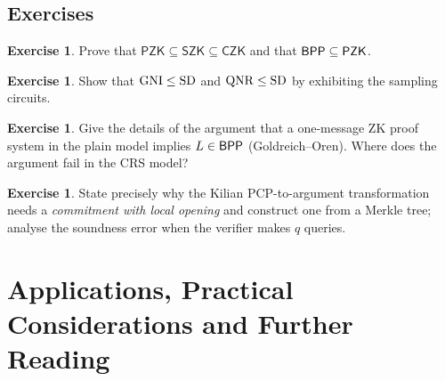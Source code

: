\documentclass[11pt,a4paper]{report}
\theoremstyle{plain}
\theoremstyle{definition}
\newtheorem{exercise}[theorem]{Exercise}
\theoremstyle{remark}
\newcommand{\SZK}{\mathsf{SZK}}\newcommand{\CZK}{\mathsf{CZK}}\newcommand{\PZK}{\mathsf{PZK}}
\begin{document}
\section*{Exercises}
\begin{exercise}
Prove that $\PZK\subseteq\SZK\subseteq\CZK$ and that $\BPP\subseteq\PZK$.
\end{exercise}
\begin{exercise}
Show that $\operatorname{GNI}\le\mathrm{SD}$ and $\operatorname{QNR}\le\mathrm{SD}$ by exhibiting the sampling circuits.
\end{exercise}
\begin{exercise}
Give the details of the argument that a one-message ZK proof system in the plain model implies $L\in\mathsf{BPP}$ (Goldreich--Oren). Where does the argument fail in the CRS model?
\end{exercise}
\begin{exercise}
State precisely why the Kilian PCP-to-argument transformation needs a \emph{commitment with local opening} and construct one from a Merkle tree; analyse the soundness error when the verifier makes $q$ queries.
\end{exercise}

\chapter{Applications, Practical Considerations and Further Reading}
\label{ch:apps}
\end{document}
